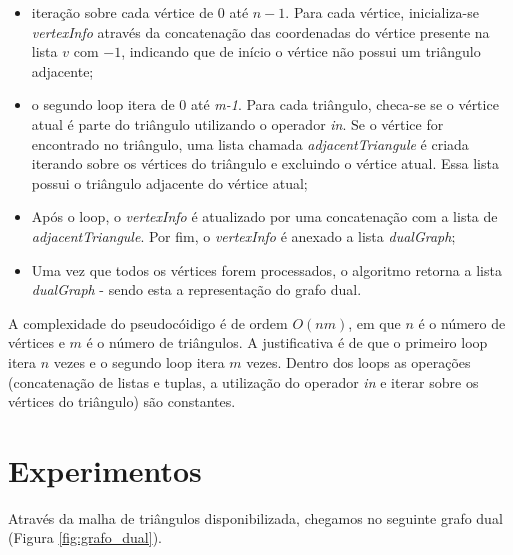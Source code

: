 \documentclass{article}
\begin{document}
\begin{itemize}
  \item iteração sobre cada vértice de 0 até $n-1$. Para cada vértice, inicializa-se \textit{vertexInfo} através da concatenação das coordenadas do vértice presente na lista $v$ com $-1$, indicando que de início o vértice não possui um triângulo adjacente;
  \item o segundo loop itera de 0 até \textit{m-1}. Para cada triângulo, checa-se se o vértice atual é parte do triângulo utilizando o operador \textit{in}. Se o vértice for encontrado no triângulo, uma lista chamada \textit{adjacentTriangule} é criada iterando sobre os vértices do triângulo e excluindo o vértice atual. Essa lista possui o triângulo adjacente do vértice atual;
  \item Após o loop, o \textit{vertexInfo} é atualizado por uma concatenação com a lista de \textit{adjacentTriangule}. Por fim, o \textit{vertexInfo} é anexado a lista \textit{dualGraph};
  \item Uma vez que todos os vértices forem processados, o algoritmo retorna a lista \textit{dualGraph} - sendo esta a representação do grafo dual.
\end{itemize}

A complexidade do pseudocóidigo é de ordem $O(nm)$, em que $n$ é o número de vértices e $m$ é o número de triângulos. A justificativa é de que o primeiro loop itera $n$ vezes e o segundo loop itera $m$ vezes. Dentro dos loops as operações (concatenação de listas e tuplas, a utilização do operador \textit{in} e iterar sobre os vértices do triângulo) são constantes.  

\section{Experimentos}

Através da malha de triângulos disponibilizada, chegamos no seguinte grafo dual (Figura \ref{fig:grafo_dual}).
\end{document}
